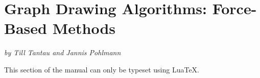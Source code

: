 %
%
%


\section{Graph Drawing Algorithms: Force-Based Methods}
\label{section-library-graphdrawing-force-based}

{\emph{by Till Tantau and Jannis Pohlmann}}

\ifluatex
\else
    This section of the manual can only be typeset using Lua\TeX.
    \expandafter\endinput
\fi


\includeluadocumentationof{pgf.gd.force.library}

\includeluadocumentationof{pgf.gd.force.ControlDeclare}
\includeluadocumentationof{pgf.gd.force.ControlStart}
\includeluadocumentationof{pgf.gd.force.ControlIteration}
\includeluadocumentationof{pgf.gd.force.ControlSprings}
\includeluadocumentationof{pgf.gd.force.ControlElectric}
\includeluadocumentationof{pgf.gd.force.ControlCoarsening}

\includeluadocumentationof{pgf.gd.force.SpringLayouts}
\includeluadocumentationof{pgf.gd.force.SpringHu2006}

\includeluadocumentationof{pgf.gd.force.SpringElectricalLayouts}
\includeluadocumentationof{pgf.gd.force.SpringElectricalHu2006}
\includeluadocumentationof{pgf.gd.force.SpringElectricalWalshaw2000}


